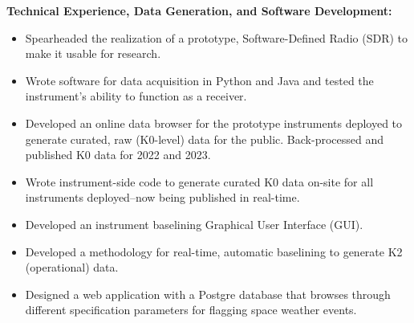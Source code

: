 \textbf{Technical Experience, Data Generation, and Software Development:}
\begin{itemize}
    \item Spearheaded the realization of a prototype, Software-Defined Radio (SDR) to make it usable for research.
    \item Wrote software for data acquisition in Python and Java and tested the instrument's ability to function as a receiver.
    \item Developed an online data browser for the prototype instruments deployed to generate curated, raw (K0-level) data for the public. Back-processed and published K0 data for 2022 and 2023.
    \item Wrote instrument-side code to generate curated K0 data on-site for all instruments deployed--now being published in real-time.
    \item Developed an instrument baselining Graphical User Interface (GUI).
    \item Developed a methodology for real-time, automatic baselining to generate K2 (operational) data.
    \item Designed a web application with a Postgre database that browses through different specification parameters for flagging space weather events.

\end{itemize}






%


